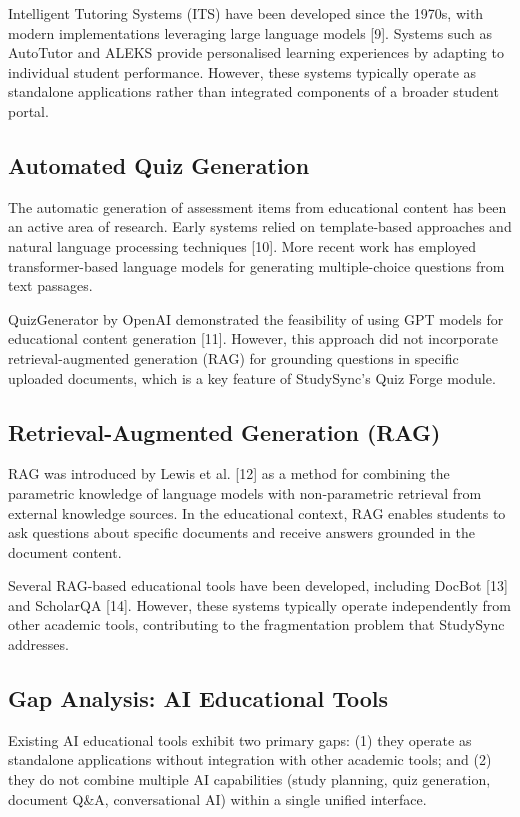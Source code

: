 \documentclass[12pt,a4paper]{report}
\begin{document}
Intelligent Tutoring Systems (ITS) have been developed since the 1970s, with modern implementations leveraging large language models [9]. Systems such as AutoTutor and ALEKS provide personalised learning experiences by adapting to individual student performance. However, these systems typically operate as standalone applications rather than integrated components of a broader student portal.

\subsection{Automated Quiz Generation}

The automatic generation of assessment items from educational content has been an active area of research. Early systems relied on template-based approaches and natural language processing techniques [10]. More recent work has employed transformer-based language models for generating multiple-choice questions from text passages.

QuizGenerator by OpenAI demonstrated the feasibility of using GPT models for educational content generation [11]. However, this approach did not incorporate retrieval-augmented generation (RAG) for grounding questions in specific uploaded documents, which is a key feature of StudySync's Quiz Forge module.

\subsection{Retrieval-Augmented Generation (RAG)}

RAG was introduced by Lewis et al. [12] as a method for combining the parametric knowledge of language models with non-parametric retrieval from external knowledge sources. In the educational context, RAG enables students to ask questions about specific documents and receive answers grounded in the document content.

Several RAG-based educational tools have been developed, including DocBot [13] and ScholarQA [14]. However, these systems typically operate independently from other academic tools, contributing to the fragmentation problem that StudySync addresses.

\subsection{Gap Analysis: AI Educational Tools}

Existing AI educational tools exhibit two primary gaps: (1) they operate as standalone applications without integration with other academic tools; and (2) they do not combine multiple AI capabilities (study planning, quiz generation, document Q\&A, conversational AI) within a single unified interface.
\end{document}
